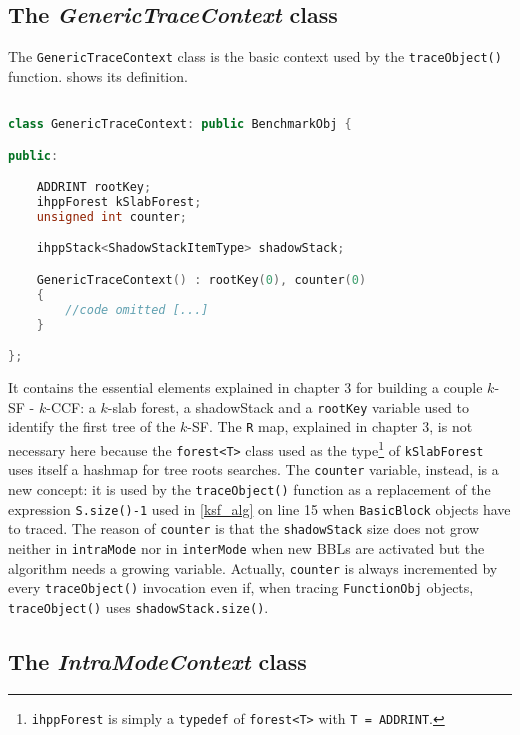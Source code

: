 \documentclass[a4paper,10pt]{report}
\begin{document}
\subsection{The \emph{GenericTraceContext} class}

The \verb|GenericTraceContext| class is the basic context used
by the \verb|traceObject()| function.  shows its definition.

\begin{lstlisting}[language=C++,
	caption={partial definition of \texttt{GenericTraceContext}},
	label=genericCtx, frame=leftline]

class GenericTraceContext: public BenchmarkObj {

public:

	ADDRINT rootKey;
	ihppForest kSlabForest;
	unsigned int counter;

	ihppStack<ShadowStackItemType> shadowStack;

	GenericTraceContext() : rootKey(0), counter(0)
	{
		//code omitted [...]
	}

};

\end{lstlisting}

\noindent
It contains the essential elements explained in chapter 3 for building
a couple $k$-SF - $k$-CCF: a $k$-slab forest, a shadowStack and a \verb|rootKey| variable used to identify the first tree of the $k$-SF.
The \verb|R| map, explained in chapter 3, is not necessary here because the \verb|forest<T>| class used as the type\footnote{\texttt{ihppForest} is simply a \texttt{typedef} of \texttt{forest<T>} with \texttt{T = ADDRINT}.} of \verb|kSlabForest| uses itself
a hashmap for tree roots searches. The \verb|counter| variable, instead, is a new concept:
it is used by the \verb|traceObject()| function as a replacement of the
expression \verb|S.size()-1| used in \cref{ksf_alg} on line 15
when \verb|BasicBlock| objects have to traced.
The reason of \verb|counter| is that the \verb|shadowStack| size does not grow
neither in \verb|intraMode| nor in \verb|interMode| when new BBLs are activated but
the algorithm needs a growing variable. Actually, \verb|counter| is always incremented
by every \verb|traceObject()| invocation even if, when tracing \verb|FunctionObj| objects, \verb|traceObject()| uses \verb|shadowStack.size()|.

\subsection{The \emph{IntraModeContext} class}
\end{document}
